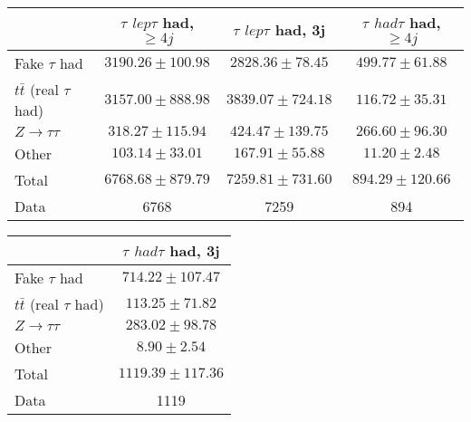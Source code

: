 \begin{table}
\begin{center}
  \begin{tabular}{ | l |  c |  c |  c | }
    \hline \hline 
     &  $\tau$ ${lep}\tau$ {had}, $\geq4j$  &  $\tau$ ${lep}\tau$ {had}, 3j  &  $\tau$ ${had}\tau$ {had}, $\geq4j$  \\ 
    \hline 
     Fake $\tau$ {had}  &   $ 3190.26 \pm 100.98 $ &   $ 2828.36 \pm 78.45 $ &   $ 499.77 \pm 61.88 $ \\ 
     $t\bar{t}$ (real $\tau$ {had})  &   $ 3157.00 \pm 888.98 $ &   $ 3839.07 \pm 724.18 $ &   $ 116.72 \pm 35.31 $ \\ 
     $Z\rightarrow\tau\tau$  &   $ 318.27 \pm 115.94 $ &   $ 424.47 \pm 139.75 $ &   $ 266.60 \pm 96.30 $ \\ 
    Other  &   $ 103.14 \pm 33.01 $ &   $ 167.91 \pm 55.88 $ &   $ 11.20 \pm 2.48 $ \\ 
    Total  &   $ 6768.68 \pm 879.79 $ &   $ 7259.81 \pm 731.60 $ &   $ 894.29 \pm 120.66 $ \\ 
    \hline 
    Data  & 6768  & 7259  & 894  \\ 
    \hline \hline 
  \end{tabular} 


  \begin{tabular}{ | l |  c | }
    \hline \hline 
     &  $\tau$ ${had}\tau$ {had}, 3j  \\ 
    \hline 
     Fake $\tau$ {had}  &   $ 714.22 \pm 107.47 $ \\ 
     $t\bar{t}$ (real $\tau$ {had})  &   $ 113.25 \pm 71.82 $ \\ 
     $Z\rightarrow\tau\tau$  &   $ 283.02 \pm 98.78 $ \\ 
    Other  &   $ 8.90 \pm 2.54 $ \\ 
    Total  &   $ 1119.39 \pm 117.36 $ \\ 
    \hline 
    Data  & 1119  \\ 
    \hline \hline 
  \end{tabular} 


\end{center}
\end{table}
